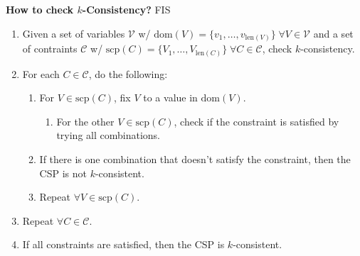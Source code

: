 \begin{process} \textbf{How to check $k$-Consistency?} FIS
    \begin{enumerate}
        \item Given a set of variables $\mathcal{V}$ w/ $\text{dom}(V) = \{v_1,\ldots,v_{\text{len}(V)}\} \; \forall V \in \mathcal{V}$ and a set of contraints $\mathcal{C}$ w/ $\text{scp}(C) = \{V_1,\ldots,V_{\text{len}(C)}\} \; \forall C \in \mathcal{C}$, check $k$-consistency.
        \item For each $C \in \mathcal{C}$, do the following:
        \begin{enumerate}
            \item For $V \in \text{scp}(C)$, fix $V$ to a value in $\text{dom}(V)$.
            \begin{enumerate}
                \item For the other $V \in \text{scp}(C)$, check if the constraint is satisfied by trying all combinations.  
            \end{enumerate}
            \item If there is one combination that doesn't satisfy the constraint, then the CSP is not $k$-consistent.
            \item Repeat $\forall V \in \text{scp}(C)$.
        \end{enumerate}
        \item Repeat $\forall C \in \mathcal{C}$.
        \item If all constraints are satisfied, then the CSP is $k$-consistent.
    \end{enumerate}
\end{process}

